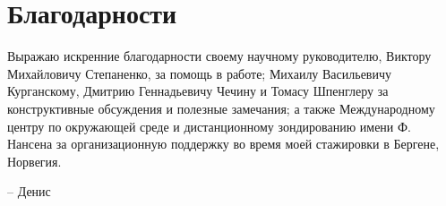 \chapter*{Благодарности}

Выражаю искренние благодарности своему научному руководителю, Виктору Михайловичу Степаненко, за помощь в работе; Михаилу Васильевичу Курганскому, Дмитрию Геннадьевичу Чечину и Томасу Шпенглеру за конструктивные обсуждения и полезные замечания; а также Международному центру по окружающей среде и дистанционному зондированию имени Ф. Нансена за организационную поддержку во время моей стажировки в Бергене, Норвегия.

\medskip\hfill -- Денис
